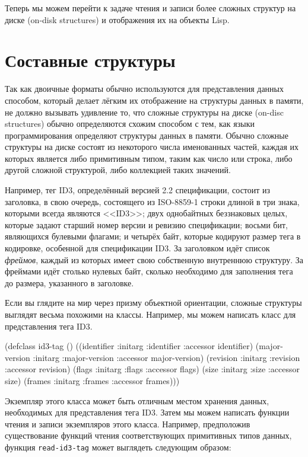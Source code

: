 Теперь мы можем перейти к задаче чтения и записи более сложных структур на диске (on-disk
structures) и отображения их на объекты Lisp.

\section{Составные структуры}

Так как двоичные форматы обычно используются для представления данных способом, который
делает лёгким их отображение на структуры данных в памяти, не должно вызывать удивление
то, что сложные структуры на диске (on-disc structures) обычно определяются схожим
способом с тем, как языки программирования определяют структуры данных в памяти. Обычно
сложные структуры на диске состоят из некоторого числа именованных частей, каждая их
которых является либо примитивным типом, таким как число или строка, либо другой сложной
структурой, либо коллекцией таких значений.

Например, тег ID3, определённый версией 2.2 спецификации, состоит из заголовка, в свою
очередь, состоящего из ISO-8859-1 строки длиной в три знака, которыми всегда являются
<<ID3>>; двух однобайтных беззнаковых целых, которые задают старший номер версии и ревизию
спецификации; восьми бит, являющихся булевыми флагами; и четырёх байт, которые кодируют
размер тега в кодировке, особенной для спецификации ID3. За заголовком идёт список
\textit{фреймов}, каждый из которых имеет свою собственную внутреннюю структуру. За
фреймами идёт столько нулевых байт, сколько необходимо для заполнения тега до размера,
указанного в заголовке.

Если вы глядите на мир через призму объектной ориентации, сложные структуры выглядят
весьма похожими на классы. Например, мы можем написать класс для представления тега ID3.

\begin{myverb}
(defclass id3-tag ()
  ((identifier    :initarg :identifier    :accessor identifier)
   (major-version :initarg :major-version :accessor major-version)
   (revision      :initarg :revision      :accessor revision)
   (flags         :initarg :flags         :accessor flags)
   (size          :initarg :size          :accessor size)
   (frames        :initarg :frames        :accessor frames)))
\end{myverb}

Экземпляр этого класса может быть отличным местом хранения данных, необходимых для
представления тега ID3. Затем мы можем написать функции чтения и записи экземпляров этого
класса. Например, предположив существование функций чтения соответствующих примитивных
типов данных, функция \lstinline{read-id3-tag} может выглядеть следующим образом:

